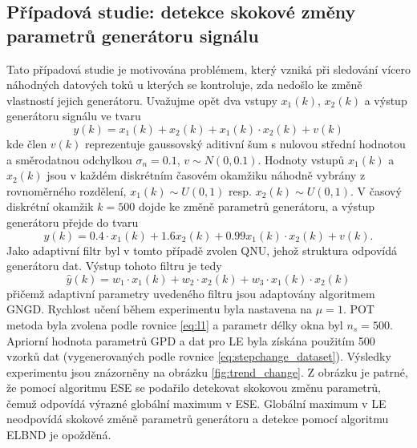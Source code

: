 \subsection{Případová studie: detekce skokové změny parametrů generátoru signálu}\label{chap:stepchange}
Tato případová studie je motivována problémem, který vzniká při sledování vícero náhodných datových toků \cite{stepchange} u kterých se kontroluje, zda nedošlo ke změně vlastností jejich generátoru. Uvažujme opět dva vstupy $x_1(k)$, $x_2(k)$ a výstup generátoru signálu ve tvaru
\begin{equation}
y(k)=x_1(k)+x_2(k)+x_1(k)\cdot x_2(k) + v(k)
\end{equation} 
kde člen $v(k)$ reprezentuje gaussovský aditivní šum s nulovou střední hodnotou a směrodatnou odchylkou $\sigma_n=0.1$, $v \sim N(0,0.1)$. Hodnoty vstupů $x_1(k)$ a $x_2(k)$ jsou v každém diskrétním časovém okamžiku náhodně vybrány z rovnoměrného rozdělení, $x_1(k) \sim U(0,1)$ resp. $x_2(k) \sim U(0,1)$. V časový diskrétní okamžik $k=500$ dojde ke změně parametrů generátoru, a výstup generátoru přejde do tvaru
\begin{equation}\label{eq:stepchange_dataset}
y(k)=0.4\cdot x_1(k) + 1.6x_2(k)+0.99x_1(k)\cdot x_2(k) + v(k).
\end{equation}
Jako adaptivní filtr byl v tomto případě zvolen QNU, jehož struktura odpovídá generátoru dat. Výstup tohoto filtru je tedy
\begin{equation}
\hat{y}(k)=w_1\cdot x_1(k)+w_2\cdot x_2(k)+w_3\cdot x_1(k)\cdot x_2(k)
\end{equation}
přičemž adaptivní parametry uvedeného filtru jsou adaptovány algoritmem GNGD. Rychlost učení během experimentu byla nastavena na $\mu=1$. POT metoda byla zvolena podle rovnice \ref{eq:l1} a parametr délky okna byl $n_s=500$. Apriorní hodnota parametrů GPD a dat pro LE byla získána použitím 500 vzorků dat (vygenerovaných podle rovnice \ref{eq:stepchange_dataset}). Výsledky experimentu jsou znázorněny na obrázku \ref{fig:trend_change}. Z obrázku je patrné, že pomocí algoritmu ESE se podařilo detekovat skokovou změnu parametrů, čemuž odpovídá výrazné globální maximum v ESE. Globální maximum v LE neodpovídá skokové změně parametrů generátoru a detekce pomocí algoritmu ELBND je opožděná.

